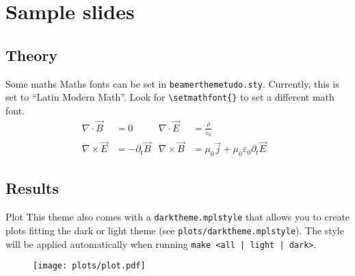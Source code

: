 \section{Sample slides}
\subsection{Theory}
\begin{frame}{Some maths}
  Maths fonts can be set in \texttt{beamerthemetudo.sty}.
  Currently, this is set to \enquote{Latin Modern Math}. Look for \texttt{\textbackslash setmathfont\{\}}
  to set a different math font.
  \begin{align*}
    \nabla \cdot \vec{B} &= 0 &
    \nabla \cdot \vec{E} &= \frac{ρ}{ε_0} \\
    \nabla \times \vec{E} &= -\partial_t \vec{B} &
    \nabla \times \vec{B} &= μ_0 \vec{j} + μ_0 ε_0 \partial_t \vec{E} &
  \end{align*}
\end{frame}

\subsection{Results}
\begin{frame}{Plot}
    This theme also comes with a \texttt{darktheme.mplstyle} that allows you to create
    plots fitting the dark or light theme (see \texttt{plots/darktheme.mplstyle}). The style will
    be applied automatically when running \texttt{make <all | light | dark>}.
  \begin{figure}
    \centering
    \texttt{[image: plots/plot.pdf]}
  \end{figure}
\end{frame}